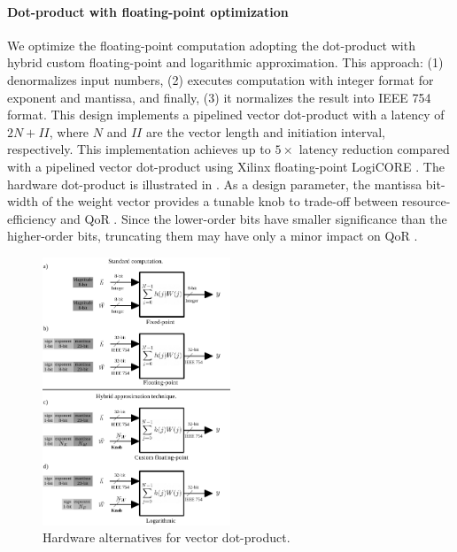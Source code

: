 \paragraph{Dot-product with floating-point optimization}
\label{sec:dot_product}
We optimize the floating-point computation adopting the dot-product with hybrid custom floating-point and logarithmic approximation\cite{nevarez2021accelerating}. This approach: (1) denormalizes input numbers, (2) executes computation with integer format for exponent and mantissa, and finally, (3) it normalizes the result into IEEE 754 format. This design implements a pipelined vector dot-product with a latency of $2N+II$, where $N$ and $II$ are the vector length and initiation interval, respectively. This implementation achieves up to $5\times$ latency reduction compared with a pipelined vector dot-product using Xilinx floating-point LogiCORE \cite{nevarez2021accelerating}. The hardware dot-product is illustrated in . As a design parameter, the mantissa bit-width of the weight vector provides a tunable knob to trade-off between resource-efficiency and QoR \cite{park2009dynamic}. Since the lower-order bits have smaller significance than the higher-order bits, truncating them may
have only a minor impact on QoR \cite{mittal2016survey}.

\begin{figure}[t!]
	\centering
	\includegraphics[width=0.5\textwidth]{../figures/dot-product_unit.pdf}
	\caption{Hardware alternatives for vector dot-product.}
	\label{fig:dot_product}
\end{figure}


